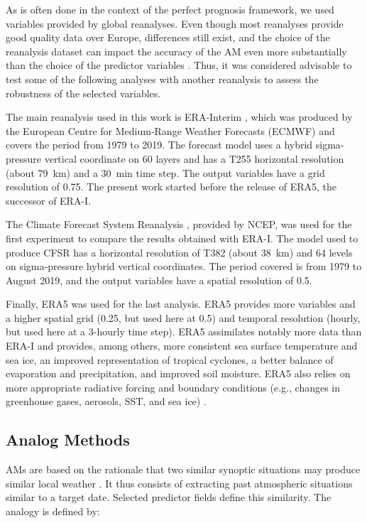 \documentclass[draft]{agujournal2019}
\begin{document}
As is often done in the context of the perfect prognosis framework, we used variables provided by global reanalyses. Even though most reanalyses provide good quality data over Europe, differences still exist, and the choice of the reanalysis dataset can impact the accuracy of the AM even more substantially than the choice of the predictor variables \cite{Horton2018b}. Thus, it was considered advisable to test some of the following analyses with another reanalysis to assess the robustness of the selected variables.

The main reanalysis used in this work is ERA-Interim \cite<ERA-I,>{Dee2011a}, which was produced by the European Centre for Medium-Range Weather Forecasts (ECMWF) and covers the period from 1979 to 2019. The forecast model uses a hybrid sigma-pressure vertical coordinate on 60 layers and has a T255 horizontal resolution (about 79~km) and a 30~min time step. The output variables have a grid resolution of 0.75\degree. The present work started before the release of ERA5, the successor of ERA-I.

The Climate Forecast System Reanalysis \cite<CFSR,>{Saha2010a}, provided by NCEP, was used for the first experiment to compare the results obtained with ERA-I. The model used to produce CFSR has a horizontal resolution of T382 (about 38~km) and 64 levels on sigma-pressure hybrid vertical coordinates. The period covered is from 1979 to August 2019, and the output variables have a spatial resolution of 0.5\degree.

Finally, ERA5 \cite{Hersbach2019} was used for the last analysis. ERA5 provides more variables and a higher spatial grid (0.25\degree, but used here at 0.5\degree) and temporal resolution (hourly, but used here at a 3-hourly time step). ERA5 assimilates notably more data than ERA-I and provides, among others, more consistent sea surface temperature and sea ice, an improved representation of tropical cyclones, a better balance of evaporation and precipitation, and improved soil moisture. ERA5 also relies on more appropriate radiative forcing and boundary conditions (e.g., changes in greenhouse gases, aerosols, SST, and sea ice) \cite{Hersbach2019}.


\subsection{Analog Methods}
\label{ams}

AMs are based on the rationale that two similar synoptic situations may produce similar local weather \cite{Lorenz1956, Lorenz1969}. It thus consists of extracting past atmospheric situations similar to a target date. Selected predictor fields define this similarity. The analogy is defined by:
\end{document}
